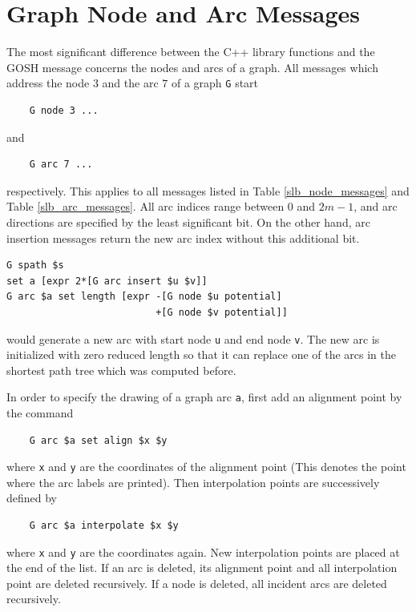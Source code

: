\documentclass[a4paper,11pt,twoside]{book}
\begin{document}
\newpage
{}
\section{Graph Node and Arc Messages}
The most significant difference between the C++ library functions and the GOSH
message concerns the nodes and arcs of a graph. All messages which address the
node $3$ and the arc $7$ of a graph \verb/G/ start
\begin{verbatim}
    G node 3 ...
\end{verbatim}
and
\begin{verbatim}
    G arc 7 ...
\end{verbatim}
respectively. This applies to all messages listed in Table
\ref{slb_node_messages} and Table \ref{slb_arc_messages}. All
arc indices range between $0$ and $2m-1$, and arc directions are
specified by the least significant bit. On the other hand, arc insertion
messages return the new arc index without this additional bit.
\begin{mysample}
\begin{verbatim}
G spath $s
set a [expr 2*[G arc insert $u $v]]
G arc $a set length [expr -[G node $u potential]
                          +[G node $v potential]]
\end{verbatim}
\end{mysample}
would generate a new arc with start node \verb/u/ and end node \verb/v/.
The new arc is initialized with zero reduced length so that it can replace one
of the arcs in the shortest path tree which was computed before.

In order to specify the drawing of a graph arc \verb/a/, first add an alignment
point by the command
\begin{verbatim}
    G arc $a set align $x $y
\end{verbatim}
where \verb/x/ and \verb/y/ are the coordinates of the alignment point
(This denotes the point where the arc labels are printed). Then interpolation
points are successively defined by
\begin{verbatim}
    G arc $a interpolate $x $y
\end{verbatim}
where \verb/x/ and \verb/y/ are the coordinates again.
New interpolation points are placed at the end of the list. If an arc
is deleted, its alignment point and all interpolation point are deleted
recursively. If a node is deleted, all incident arcs are deleted
recursively.
\end{document}
